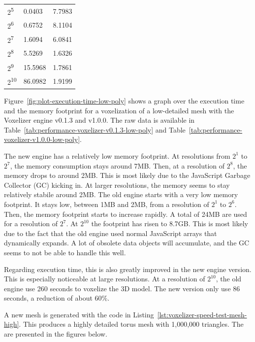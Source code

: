 \begin{table}[H]
\begin{minipage}[t]{.45\linewidth}
\begin{tabularx}{\textwidth}{*{3}{|Y}|}
            2\textsuperscript{5} & 0.0403 & 7.7983\\
            2\textsuperscript{6} & 0.6752 & 8.1104\\
            2\textsuperscript{7} & 1.6094 & 6.0841\\
            2\textsuperscript{8} & 5.5269 & 1.6326\\
            2\textsuperscript{9} & 15.5968 & 1.7861\\
            2\textsuperscript{10} & 86.0982 & 1.9199\\
            \hline
        \end{tabularx}
    \end{minipage}
\end{table}

Figure~\ref{fig:plot-execution-time-low-poly} shows a graph over the execution time and the memory footprint for a voxelization of a low-detailed mesh with the Voxelizer engine v0.1.3 and v1.0.0. The raw data is available in Table~\ref{tab:performance-voxelizer-v0.1.3-low-poly} and Table~\ref{tab:performance-voxelizer-v1.0.0-low-poly}.

The new engine has a relatively low memory footprint. At resolutions from $2^1$ to $2^7$, the memory consumption stays around 7MB. Then, at a resolution of $2^8$, the memory drops to around 2MB. This is most likely due to the JavaScript Garbage Collector (GC) kicking in. At larger resolutions, the memory seems to stay relatively stabile around 2MB. The old engine starts with a very low memory footprint. It stays low, between 1MB and 2MB, from a resolution of $2^1$ to $2^6$. Then, the memory footprint starts to increase rapidly. A total of 24MB are used for a resolution of $2^7$. At $2^10$ the footprint has risen to 8.7GB. This is most likely due to the fact that the old engine used normal JavaScript arrays that dynamically expands. A lot of obsolete data objects will accumulate, and the GC seems to not be able to handle this well.

Regarding execution time, this is also greatly improved in the new engine version. This is especially noticeable at large resolutions. At a resolution of $2^10$, the old engine use 260 seconds to voxelize the 3D model. The new version only use 86 seconds, a reduction of about $60\%$.

A new mesh is generated with the code in Listing~\ref{lst:voxelizer-speed-test-mesh-high}. This produces a highly detailed torus mesh with 1,000,000 triangles. The are presented in the figures below.

